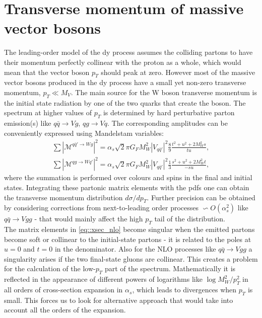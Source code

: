 	
		 \section{Transverse momentum of massive vector bosons }
		 The leading-order model of the \gls{dy} process assumes the colliding partons to have their momentum perfectly collinear with the proton as a whole, which would mean that the vector boson $p_T$ should peak at zero. However most of the massive vector bosons produced in the \gls{dy} process have a small yet non-zero transverse momentum, $p_T \ll M_V$. The main source for the W boson transverse momentum is the initial state radiation by one of the two quarks that create the boson.
		 The spectrum at higher values of $p_T$ is determined by hard perturbative parton emission(s) like $q\bar q \rightarrow Vg$, $qg \rightarrow Vq$. The corresponding amplitudes can be conveniently expressed using Mandelstam variables:
	\begin{equation}
	\begin{array}{lcl} 
	\label{eq::xsec_nlo}
		 \sum |\mathcal{M}^{q\bar q'\rightarrow Wg}|^2= \alpha_s \sqrt{2}\pi G_F M^2_W |V_{q\bar q'}|^2 \frac{8}{9}\frac{t^2+u^2+2M_W^2s}{tu},\\
		 \sum |\mathcal{M}^{qg\rightarrow Wq'}|^2= \alpha_s \sqrt{2}\pi G_F M^2_W |V_{q\bar q'}|^2 \frac{1}{3}\frac{s^2+u^2+2M_W^2t}{-su},
		 \end{array}
	 \end{equation}	
	 where the summation is performed over colours and spins in the final and initial states. Integrating these partonic matrix elements with the \gls{pdf}s one can obtain the transverse momentum distribution $d\sigma/dp_T$. Further precision can be obtained by considering corrections from next-to-leading order processes $\backsim O(\alpha_s^2)$ like $q \bar q \rightarrow Vgg$ - that would mainly affect the high $p_T$ tail of the distribution. \\
	 The matrix elements in \ref{eq::xsec_nlo} become singular when the emitted partons become soft or collinear to the initial-state partons - it is related to the poles at $u=0$ and $t = 0$ in the denominator. Also for the NLO processes like $q \bar q \rightarrow Vgg$ a singularity arises if the two final-state gluons are collinear. This creates a problem for the calculation of the low-$p_T$ part of the spectrum. Mathematically it is reflected in the appearance of different powers of logarithms like $\log{M^2_W/p^2_T}$ in all orders of cross-section expansion in $\alpha_s$, which leads to divergences when $p_T$ is small. This forces us to look for alternative approach that would take into account all the orders of the expansion.\\
